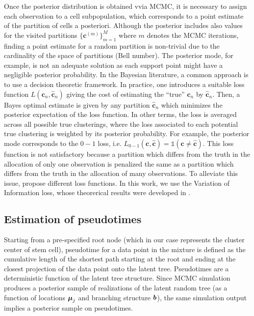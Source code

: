 Once the posterior distribution is obtained vvia MCMC, it is necessary to assign each observation to a cell subpopulation, which corresponds to a point estimate of the partition of cells a posteriori. Although the posterior includes also values for the visited partitions $\{\bm{c}^{(m)}\}_{m=1}^M$ where $m$ denotes the MCMC iterations, finding a point estimate for a random partition is non-trivial due to the cardinality of the space of partitions (Bell number). 
The posterior mode, for example, is not an adequate solution as each support point might have a negligible posterior probability.
In the Bayesian literature, a common approach is to use a decision theoretic framework.
In practice, one introduces a suitable loss function $L(\bm{c}_n,\hat{\bm{c}}_n)$ giving the cost of estimating the ``true'' $\bm{c}_n$ by $\hat{\bm{c}}_n$.
Then, a Bayes optimal estimate is given by any partition $\hat{\bm{c}}_n$ which minimizes the posterior expectation of the loss function. 
In other terms, the loss is averaged across all possible true clusterings, where the loss associated to each potential true clustering is weighted by its posterior probability.
For example, the posterior mode corresponds to the $0-1$ loss, i.e. $L_{0-1}(\bm{c},\hat{\bm{c}}) = \mathds{1}(\bm{c} \neq \hat{\bm{c}})$. 
This loss function is not satisfactory because a partition which differs from the truth in the allocation of only one observation is penalized the same as a partition which differs from the truth in the allocation of many observations.
To alleviate this issue, \cite{dahl2006, lau2007bayesian, wade2018bayesian} propose different loss functions. In this work, we use the Variation of Information loss, whose theorerical results were developed in \cite{wade2018bayesian}.

\subsection{Estimation of pseudotimes}

Starting from a pre-specified root node (which in our case represents
the cluster center of stem cell), pseudotime for a data point in the mixture
 is defined as the cumulative length of the shortest path starting
at the root and ending at the closest projection of the data point
onto the latent tree. 
Pseudotimes are a 
deterministic function of the latent tree structure. 
Since MCMC simulation produces a posterior sample of realizations of
the latent random tree (as a function of locations $\mbox{\boldmath $\mu$}_j$ and
branching structure $\mbox{\boldmath $b$}$), the same simulation output implies a
posterior sample on pseudotimes. 
%

